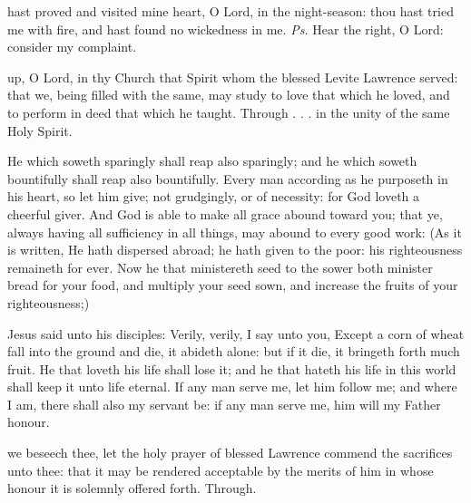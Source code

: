 
\introit
{} hast proved and visited mine heart, O Lord, in the night-season: thou hast tried me with fire, and hast found no wickedness in me. \textit{Ps.} Hear the right, O Lord: consider my complaint.

\collect
{} up, O Lord, in thy Church that Spirit whom the blessed Levite Lawrence served: that we, being filled with the same, may study to love that which he loved, and to perform in deed that which he taught. Through . . . in the unity of the same Holy Spirit.

 He which soweth sparingly shall reap also sparingly; and he which soweth bountifully shall reap also bountifully. Every man according as he purposeth in his heart, so let him give; not grudgingly, or of necessity: for God loveth a cheerful giver. And God is able to make all grace abound toward you; that ye, always having all sufficiency in all things, may abound to every good work: (As it is written, He hath dispersed abroad; he hath given to the poor: his righteousness remaineth for ever. Now he that ministereth seed to the sower both minister bread for your food, and multiply your seed sown, and increase the fruits of your righteousness;)


 Jesus said unto his disciples: Verily, verily, I say unto you, Except a corn of wheat fall into the ground and die, it abideth alone: but if it die, it bringeth forth much fruit. He that loveth his life shall lose it; and he that hateth his life in this world shall keep it unto life eternal. If any man serve me, let him follow me; and where I am, there shall also my servant be: if any man serve me, him will my Father honour.


\secret
{} we beseech thee, let the holy prayer of blessed Lawrence commend the sacrifices unto thee: that it may be rendered acceptable by the merits of him in whose honour it is solemnly offered forth. Through.

